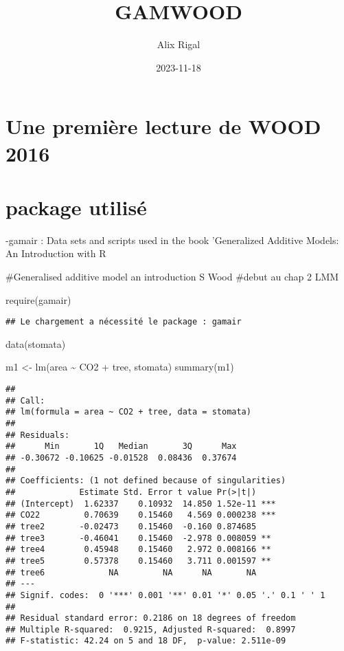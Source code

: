 \documentclass[
]{article}
\title{GAMWOOD}
\author{Alix Rigal}
\date{2023-11-18}
\newenvironment{Shaded}{\begin{snugshade}}{\end{snugshade}}
\newcommand{\FunctionTok}[1]{\textcolor[rgb]{0.00,0.00,0.00}{#1}}
\newcommand{\NormalTok}[1]{#1}
\newcommand{\OtherTok}[1]{\textcolor[rgb]{0.56,0.35,0.01}{#1}}
\newcommand{\SpecialCharTok}[1]{\textcolor[rgb]{0.00,0.00,0.00}{#1}}
\begin{document}
\maketitle

{
\setcounter{tocdepth}{2}
\tableofcontents
}
\hypertarget{une-premiuxe8re-lecture-de-wood-2016}{%
\section{Une première lecture de WOOD
2016}\label{une-premiuxe8re-lecture-de-wood-2016}}

\hypertarget{package-utilisuxe9}{%
\section{package utilisé}\label{package-utilisuxe9}}

-gamair : Data sets and scripts used in the book 'Generalized Additive
Models: An Introduction with R

\#Generalised additive model an introduction S Wood \#debut au chap 2
LMM

\begin{Shaded}
\begin{Highlighting}[]
\FunctionTok{require}\NormalTok{(gamair)}
\end{Highlighting}
\end{Shaded}

\begin{verbatim}
## Le chargement a nécessité le package : gamair
\end{verbatim}

\begin{Shaded}
\begin{Highlighting}[]
\FunctionTok{data}\NormalTok{(stomata)}

\NormalTok{m1 }\OtherTok{\textless{}{-}} \FunctionTok{lm}\NormalTok{(area }\SpecialCharTok{\textasciitilde{}}\NormalTok{ CO2 }\SpecialCharTok{+}\NormalTok{ tree, stomata)}
\FunctionTok{summary}\NormalTok{(m1)}
\end{Highlighting}
\end{Shaded}

\begin{verbatim}
## 
## Call:
## lm(formula = area ~ CO2 + tree, data = stomata)
## 
## Residuals:
##      Min       1Q   Median       3Q      Max 
## -0.30672 -0.10625 -0.01528  0.08436  0.37674 
## 
## Coefficients: (1 not defined because of singularities)
##             Estimate Std. Error t value Pr(>|t|)    
## (Intercept)  1.62337    0.10932  14.850 1.52e-11 ***
## CO22         0.70639    0.15460   4.569 0.000238 ***
## tree2       -0.02473    0.15460  -0.160 0.874685    
## tree3       -0.46041    0.15460  -2.978 0.008059 ** 
## tree4        0.45948    0.15460   2.972 0.008166 ** 
## tree5        0.57378    0.15460   3.711 0.001597 ** 
## tree6             NA         NA      NA       NA    
## ---
## Signif. codes:  0 '***' 0.001 '**' 0.01 '*' 0.05 '.' 0.1 ' ' 1
## 
## Residual standard error: 0.2186 on 18 degrees of freedom
## Multiple R-squared:  0.9215, Adjusted R-squared:  0.8997 
## F-statistic: 42.24 on 5 and 18 DF,  p-value: 2.511e-09
\end{verbatim}
\end{document}
